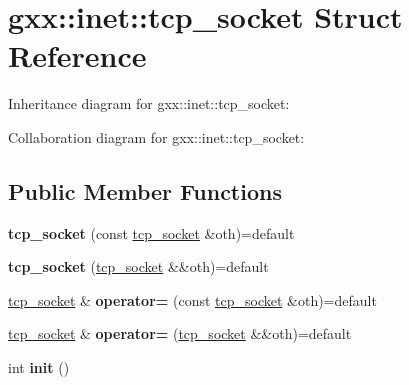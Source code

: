 \hypertarget{structgxx_1_1inet_1_1tcp__socket}{}\section{gxx\+:\+:inet\+:\+:tcp\+\_\+socket Struct Reference}
\label{structgxx_1_1inet_1_1tcp__socket}


Inheritance diagram for gxx\+:\+:inet\+:\+:tcp\+\_\+socket\+:


Collaboration diagram for gxx\+:\+:inet\+:\+:tcp\+\_\+socket\+:
\subsection*{Public Member Functions}
\begin{DoxyCompactItemize}
\item 
{\bfseries tcp\+\_\+socket} (const \hyperlink{structgxx_1_1inet_1_1tcp__socket}{tcp\+\_\+socket} \&oth)=default\hypertarget{structgxx_1_1inet_1_1tcp__socket_abf0b3464bb01c9766840b9ae3130eede}{}\label{structgxx_1_1inet_1_1tcp__socket_abf0b3464bb01c9766840b9ae3130eede}

\item 
{\bfseries tcp\+\_\+socket} (\hyperlink{structgxx_1_1inet_1_1tcp__socket}{tcp\+\_\+socket} \&\&oth)=default\hypertarget{structgxx_1_1inet_1_1tcp__socket_ab2f751a7c984889b3467e8ea24ee6535}{}\label{structgxx_1_1inet_1_1tcp__socket_ab2f751a7c984889b3467e8ea24ee6535}

\item 
\hyperlink{structgxx_1_1inet_1_1tcp__socket}{tcp\+\_\+socket} \& {\bfseries operator=} (const \hyperlink{structgxx_1_1inet_1_1tcp__socket}{tcp\+\_\+socket} \&oth)=default\hypertarget{structgxx_1_1inet_1_1tcp__socket_abcfd6ae0a29927ddce390f106ce3160e}{}\label{structgxx_1_1inet_1_1tcp__socket_abcfd6ae0a29927ddce390f106ce3160e}

\item 
\hyperlink{structgxx_1_1inet_1_1tcp__socket}{tcp\+\_\+socket} \& {\bfseries operator=} (\hyperlink{structgxx_1_1inet_1_1tcp__socket}{tcp\+\_\+socket} \&\&oth)=default\hypertarget{structgxx_1_1inet_1_1tcp__socket_a76c768bb90e3a3a10931a67db0d16c68}{}\label{structgxx_1_1inet_1_1tcp__socket_a76c768bb90e3a3a10931a67db0d16c68}

\item 
int {\bfseries init} ()\hypertarget{structgxx_1_1inet_1_1tcp__socket_a41f956a13a7fef7fa9413e37a17e5b09}{}\label{structgxx_1_1inet_1_1tcp__socket_a41f956a13a7fef7fa9413e37a17e5b09}


\end{DoxyCompactItemize}
